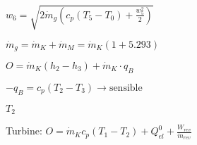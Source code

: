 \( w_6 = \sqrt{2 \dot{m}_g \left( c_p (T_5 - T_0) + \frac{w_5^2}{2} \right)} \)

\( \dot{m}_g = \dot{m}_K + \dot{m}_M = \dot{m}_K (1 + 5.293) \)

\( O = \dot{m}_K (h_2 - h_3) + \dot{m}_K \cdot q_B \)

\( -q_B = c_p (T_2 - T_3) \rightarrow \text{sensible} \)

\( T_2 \)

Turbine:  
\( O = \dot{m}_K c_p (T_1 - T_2) + Q_{el}^0 + \frac{W_{rev}}{\dot{m}_{rev}} \)